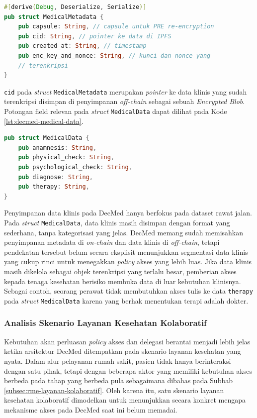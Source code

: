 \documentclass[bahasa, 12pt, a4paper, onecolumn, oneside, final]{report}
\begin{document}
\begin{lstlisting}[language=Rust, caption={Struktur serialisasi metadata medis DecMed}, label={lst:decmed-medical-metadata}]
#[derive(Debug, Deserialize, Serialize)]
pub struct MedicalMetadata {
    pub capsule: String, // capsule untuk PRE re-encryption
    pub cid: String, // pointer ke data di IPFS
    pub created_at: String, // timestamp
    pub enc_key_and_nonce: String, // kunci dan nonce yang 
    // terenkripsi
}
\end{lstlisting}

\texttt{cid} pada \textit{struct} \texttt{MedicalMetadata} merupakan \textit{pointer} ke data klinis yang sudah terenkripsi disimpan di penyimpanan \textit{off-chain} sebagai sebuah \textit{Encrypted Blob}. Potongan field relevan pada \textit{struct} \texttt{MedicalData} dapat dilihat pada Kode \ref{lst:decmed-medical-data}.

\begin{lstlisting}[language=Rust, caption={Potongan struktur data medis \textit{off-chain} pada DecMed}, label={lst:decmed-medical-data}]
pub struct MedicalData {
    pub anamnesis: String,
    pub physical_check: String,
    pub psychological_check: String,
    pub diagnose: String,
    pub therapy: String,
}
\end{lstlisting}

Penyimpanan data klinis pada DecMed hanya berfokus pada dataset rawat jalan. Pada \textit{struct} \texttt{MedicalData}, data klinis masih disimpan dengan format yang sederhana, tanpa kategorisasi yang jelas. DecMed memang sudah memisahkan penyimpanan metadata di \textit{on-chain} dan data klinis di \textit{off-chain}, tetapi pendekatan tersebut belum secara eksplisit menunjukkan segmentasi data klinis yang cukup rinci untuk menegakkan \textit{policy} akses yang lebih luas. Jika data klinis masih dikelola sebagai objek terenkripsi yang terlalu besar, pemberian akses kepada tenaga kesehatan berisiko membuka data di luar kebutuhan klinisnya. Sebagai contoh, seorang perawat tidak membutuhkan akses tulis ke data \texttt{therapy} pada \textit{struct} \texttt{MedicalData} karena yang berhak menentukan terapi adalah dokter.

\subsubsection{Analisis Skenario Layanan Kesehatan Kolaboratif}
\label{subsubsec:analisis-skenario-layanan-klinis}
Kebutuhan akan perluasan \textit{policy} akses dan delegasi berantai menjadi lebih jelas ketika arsitektur DecMed ditempatkan pada skenario layanan kesehatan yang nyata. Dalam alur pelayanan rumah sakit, pasien tidak hanya berinteraksi dengan satu pihak, tetapi dengan beberapa aktor yang memiliki kebutuhan akses berbeda pada tahap yang berbeda pula sebagaimana dibahas pada Subbab \ref{subsec:rme-layanan-kolaboratif}. Oleh karena itu, satu skenario layanan kesehatan kolaboratif dimodelkan untuk menunjukkan secara konkret mengapa mekanisme akses pada DecMed saat ini belum memadai.
\end{document}
